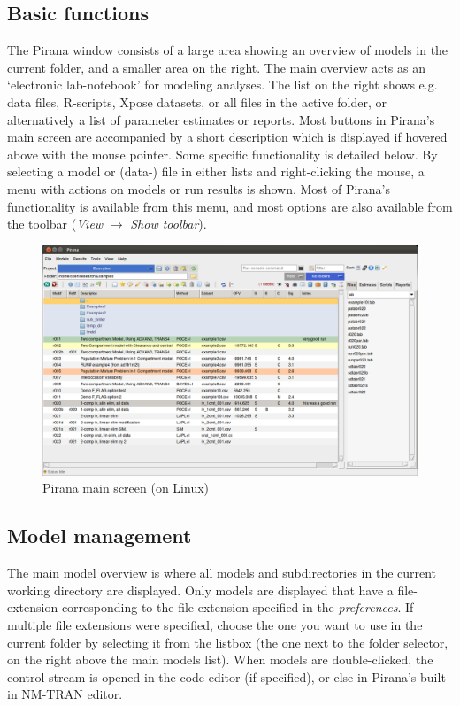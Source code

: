 {\subsection{Basic functions} The Pirana window consists of a large
area showing an overview of models in the current folder, and a
smaller area on the right. The main overview acts as an `electronic lab-notebook' for
modeling analyses. The list on the right shows e.g. data files, R-scripts,
Xpose datasets, or all files in the active folder, or alternatively a
list of parameter estimates or reports. Most buttons in Pirana's main
screen are accompanied by a short description which is displayed if
hovered above with the mouse pointer. Some specific functionality is
detailed below. By selecting a model or (data-) file in either lists
and right-clicking the mouse, a menu with actions on models or run
results is shown. Most of Pirana's functionality is available from
this menu, and most options are also available from the toolbar
(\textit{View} $\rightarrow$ \textit{Show toolbar}).

\begin{figure}[H] \centering
    \includegraphics[scale=0.25]{images/pirana_main_screen.png}
    \caption{Pirana main screen (on Linux)}
\end{figure}

\subsection{Model management} The main model overview is
where all models and subdirectories in the current working directory
are displayed. Only models are displayed that have a file-extension
corresponding to the file extension specified in the
\textit{preferences}. If multiple file extensions were specified, choose the
one you want to use in the current folder by selecting it from the listbox
(the one next to the folder selector, on the right above the main models list).
When models are double-clicked, the control stream is opened in the
code-editor (if specified), or else in Pirana's built-in NM-TRAN
editor.

}

